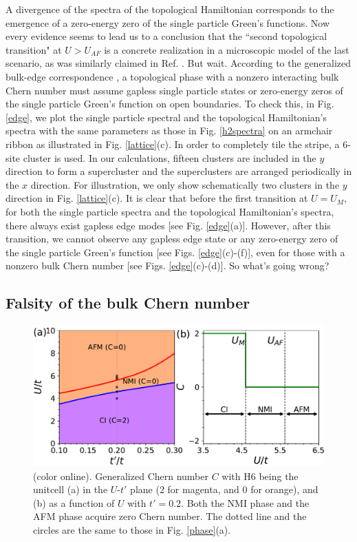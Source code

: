 \documentclass[12pt]{iopart}
\begin{document}
\par A divergence of the spectra of the topological Hamiltonian corresponds to the emergence of a zero-energy zero of the single particle Green's functions. Now every evidence seems to lead us to a conclusion that the ``second topological transition" at $U>U_{AF}$ is a concrete realization in a microscopic model of the last scenario, as was similarly claimed in Ref. \cite{WFSM_PRB2016}. But wait. According to the generalized bulk-edge correspondence \cite{G_PRB2011,EG_PRB2011}, a topological phase with a nonzero interacting bulk Chern number must assume gapless single particle states or zero-energy zeros of the single particle Green's function on open boundaries. To check this, in Fig. \ref{edge}, we plot the single particle spectral and the topological Hamiltonian's spectra with the same parameters as those in Fig. \ref{h2spectra} on an armchair ribbon as illustrated in Fig. \ref{lattice}(c). In order to completely tile the stripe, a 6-site cluster is used. In our calculations, fifteen clusters are included in the $y$ direction to form a supercluster and the superclusters are arranged periodically in the $x$ direction. For illustration, we only show schematically two clusters in the $y$ direction in Fig. \ref{lattice}(c). It is clear that before the first transition at $U=U_M$, for both the single particle spectra and the topological Hamiltonian's spectra, there always exist gapless edge modes [see Fig. \ref{edge}(a)]. However, after this transition, we cannot observe any gapless edge state or any zero-energy zero of the single particle Green's function [see Figs. \ref{edge}(c)-(f)], even for those with a nonzero bulk Chern number [see Figs. \ref{edge}(c)-(d)]. So what's going wrong?


\subsection{Falsity of the bulk Chern number}

\begin{figure}
\centering
\includegraphics[scale=0.6]{h6chernnumber}
\caption{(color online). Generalized Chern number $C$ with H6 being the unitcell (a) in the $U$-$t'$ plane (2 for magenta, and 0 for orange), and (b) as a function of $U$ with $t'=0.2$. Both the NMI phase and the AFM phase acquire zero Chern number. The dotted line and the circles are the same to those in Fig. \ref{phase}(a).}\label{h6chernnumber}
\end{figure}
\end{document}

